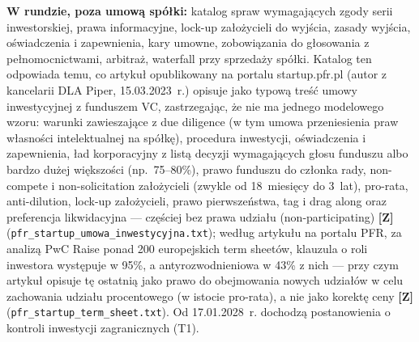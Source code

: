 \documentclass[12pt,a4paper]{report}
\newcommand{\Wiar}[1]{\textbf{[#1]}}
\begin{document}
\textbf{W rundzie, poza umową spółki:} katalog spraw wymagających zgody serii inwestorskiej, prawa informacyjne, lock-up założycieli do wyjścia, zasady wyjścia, oświadczenia i zapewnienia, kary umowne, zobowiązania do głosowania z pełnomocnictwami, arbitraż, waterfall przy sprzedaży spółki. Katalog ten odpowiada temu, co artykuł opublikowany na portalu startup.pfr.pl (autor z kancelarii DLA Piper, 15.03.2023~r.) opisuje jako typową treść umowy inwestycyjnej z funduszem VC, zastrzegając, że nie ma jednego modelowego wzoru: warunki zawieszające z due diligence (w tym umowa przeniesienia praw własności intelektualnej na spółkę), procedura inwestycji, oświadczenia i zapewnienia, ład korporacyjny z listą decyzji wymagających głosu funduszu albo bardzo dużej większości (np.~75--80\%), prawo funduszu do członka rady, non-compete i non-solicitation założycieli (zwykle od 18~miesięcy do 3~lat), pro-rata, anti-dilution, lock-up założycieli, prawo pierwszeństwa, tag i drag along oraz preferencja likwidacyjna --- częściej bez prawa udziału (non-participating) \Wiar{Z} (\texttt{pfr\_startup\_umowa\_inwestycyjna.txt}); według artykułu na portalu PFR, za analizą PwC Raise ponad 200 europejskich term sheetów, klauzula o roli inwestora występuje w 95\%, a antyrozwodnieniowa w 43\% z nich --- przy czym artykuł opisuje tę ostatnią jako prawo do obejmowania nowych udziałów w celu zachowania udziału procentowego (w istocie pro-rata), a nie jako korektę ceny \Wiar{Z} (\nolinkurl{pfr_startup_term_sheet.txt}). Od 17.01.2028~r. dochodzą postanowienia o kontroli inwestycji zagranicznych (T1).
\end{document}
